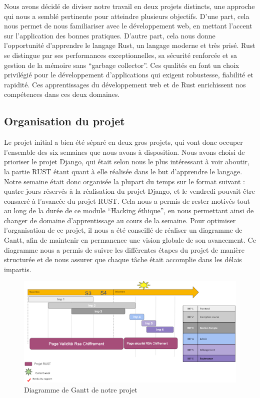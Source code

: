 \documentclass[12pt]{article} %
\begin{document}
	Nous avons décidé de diviser notre travail en deux projets distincts, une approche qui nous a semblé pertinente pour atteindre plusieurs objectifs. D'une part, cela nous permet de nous familiariser avec le développement web, en mettant l'accent sur l'application des bonnes pratiques. D'autre part, cela nous donne l'opportunité d'apprendre le langage Rust, un langage moderne et très prisé.
	Rust se distingue par ses performances exceptionnelles, sa sécurité renforcée et sa gestion de la mémoire sans “garbage collector”. Ces qualités en font un choix privilégié pour le développement d’applications qui exigent robustesse, fiabilité et rapidité. Ces apprentissages du développement web et de Rust enrichissent nos compétences dans ces deux domaines.

	\subsection{Organisation du projet}

	Le projet initial a bien été séparé en deux gros projets, qui vont donc occuper l’ensemble des six semaines que nous avons à disposition. Nous avons choisi de prioriser le projet Django, qui était selon nous le plus intéressant à voir aboutir, la partie RUST étant quant à elle réalisée dans le but d’apprendre le langage. 
	Notre semaine était donc organisée la plupart du temps sur le format suivant : quatre jours réservés à la réalisation du projet Django, et le vendredi pouvait être consacré à l'avancée du projet RUST. Cela nous a permis de rester motivés tout au long de la durée de ce module “Hacking éthique”, en nous permettant ainsi de changer de domaine d’apprentissage au cours de la semaine.
	Pour optimiser l’organisation de ce projet, il nous a été conseillé de réaliser un diagramme de Gantt, afin de maintenir en permanence une vision globale de son avancement. Ce diagramme nous a permis de suivre les différentes étapes du projet de manière structurée et de nous assurer que chaque tâche était accomplie dans les délais impartis.


	\begin{figure}[!h]
	\begin{center}
	\includegraphics[scale=1]{images/diagrammeGantt}
	\caption{Diagramme de Gantt de notre projet}
	\end{center}	
	\end{figure}
	
\end{document}
